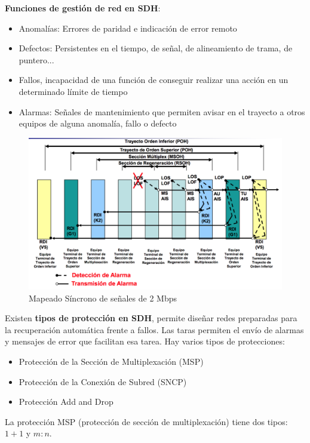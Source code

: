 \documentclass[10pt,portrait, twocolumn]{article}
\begin{document}
\textbf{Funciones de gestión de red en SDH}:

	\begin{itemize}
		\item Anomalías: Errores de paridad e indicación de error remoto
		\item Defectos: Persistentes en el tiempo, de señal, de alineamiento de trama, de puntero...
		\item Fallos, incapacidad de una función de conseguir realizar una acción en un determinado límite de tiempo
		\item Alarmas: Señales de mantenimiento que permiten avisar en el trayecto a otros equipos de alguna anomalía, fallo o defecto
	\end{itemize}
	
	\begin{figure}[!ht]
 		\centering
  		 \includegraphics[scale = 0.4]{images/Defectos}
		\caption{Mapeado Síncrono de señales de 2 Mbps}
	\end{figure}

Existen \textbf{tipos de protección en SDH}, permite diseñar redes preparadas para la recuperación automática frente a fallos. Las taras permiten el envío de alarmas y mensajes de error que facilitan esa tarea. Hay varios tipos de protecciones:

	\begin{itemize}
		\item Protección de la Sección de Multiplexación (MSP)
		\item Protección de la Conexión de Subred (SNCP)
		\item Protección Add and Drop
	\end{itemize}
	
La protección MSP (protección de sección de multiplexación) tiene dos tipos: $1+1$ y $m:n$.
\end{document}
